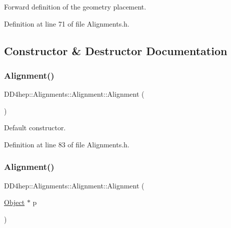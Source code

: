 Forward definition of the geometry placement. 



Definition at line 71 of file Alignments.\+h.



\subsection{Constructor \& Destructor Documentation}
\hypertarget{class_d_d4hep_1_1_alignments_1_1_alignment_a3b4f4e5289181ce34cf88d4d59d40ad3}{}\label{class_d_d4hep_1_1_alignments_1_1_alignment_a3b4f4e5289181ce34cf88d4d59d40ad3} 
\subsubsection{\texorpdfstring{Alignment()}{Alignment()}\hspace{0.1cm}{\footnotesize\ttfamily [1/4]}}
{\footnotesize\ttfamily D\+D4hep\+::\+Alignments\+::\+Alignment\+::\+Alignment (\begin{DoxyParamCaption}{ }\end{DoxyParamCaption})\hspace{0.3cm}{\ttfamily [inline]}}



Default constructor. 



Definition at line 83 of file Alignments.\+h.

\hypertarget{class_d_d4hep_1_1_alignments_1_1_alignment_afb90531c93e16959b04cfe00ede8e9a1}{}\label{class_d_d4hep_1_1_alignments_1_1_alignment_afb90531c93e16959b04cfe00ede8e9a1} 
\subsubsection{\texorpdfstring{Alignment()}{Alignment()}\hspace{0.1cm}{\footnotesize\ttfamily [2/4]}}
{\footnotesize\ttfamily D\+D4hep\+::\+Alignments\+::\+Alignment\+::\+Alignment (\begin{DoxyParamCaption}\item[{\hyperlink{class_d_d4hep_1_1_alignments_1_1_alignment_a3ed6fd0370cb7b8015d772df7ff005fc}{Object} $\ast$}]{p }\end{DoxyParamCaption})\hspace{0.3cm}{\ttfamily [inline]}}



